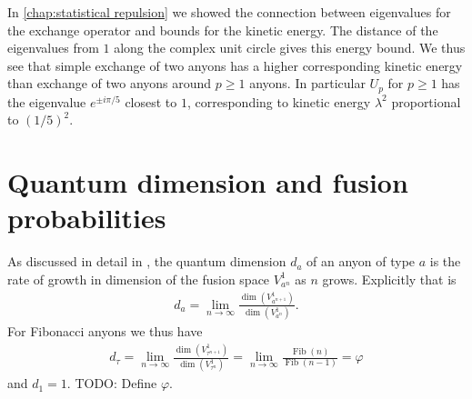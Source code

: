 \documentclass[a4paper,10pt,oneside]{book}
\theoremstyle{plain}
\newtheorem{corollary}[theorem]{Corollary}
\theoremstyle{definition}
\theoremstyle{remark}
\DeclareMathOperator{\Fib}{Fib}
\begin{document}
In \cref{chap:statistical repulsion} we showed the connection between eigenvalues for the exchange operator and bounds for the kinetic energy. The distance of the eigenvalues from $1$ along the complex unit circle gives this energy bound. We thus see that simple exchange of two anyons has a higher corresponding kinetic energy than exchange of two anyons around $p \ge 1$ anyons. In particular $U_p$ for $p \ge 1$ has the eigenvalue $e^{\pm iπ/5}$ closest to $1$, corresponding to kinetic energy $λ^2$ proportional to $(1/5)^2$.













\section{Quantum dimension and fusion probabilities}

As discussed in detail in \cite{preskill}, the quantum dimension $d_a$ of an anyon of type $a$ is the rate of growth in dimension of the fusion space $V_{a^n}^1$ as $n$ grows.
Explicitly that is
\begin{align}
  d_a = \lim_{n\to\infty} \frac{\operatorname{dim}\left( V^1_{a^{n+1}} \right)}{\operatorname{dim}\left( V^1_{a^{n}} \right)}.
\end{align}
For Fibonacci anyons we thus have
\begin{align}
  d_\tau = \lim_{n\to\infty} \frac{\operatorname{dim}\left( V^1_{\tau^{n+1}} \right)}{\operatorname{dim}\left( V^1_{\tau^{n}} \right)}
  = \lim_{n\to\infty} \frac{\Fib(n)}{\Fib(n-1)} = \varphi
\end{align}
and $d_1 = 1$. TODO: Define $\varphi$.
\end{document}
